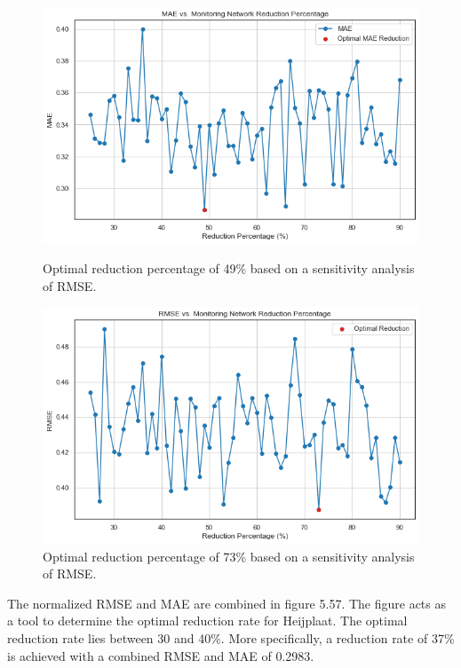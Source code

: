 \begin{figure}[h]
    \centering
    \begin{minipage}{0.45\linewidth}
        \includegraphics[width=\linewidth]{heij37rr.png}
        \caption{Optimal reduction percentage of 49\% based on a sensitivity analysis of RMSE.}
    \end{minipage}
    \hfill
    \begin{minipage}{0.45\linewidth}
        \includegraphics[width=\linewidth]{heij37rrrm.png}
        \caption{Optimal reduction percentage of 73\% based on a sensitivity analysis of RMSE.}
    \end{minipage}
\end{figure}

The normalized RMSE and MAE are combined in figure 5.57. The figure acts as a tool to determine the optimal reduction rate for Heijplaat. The optimal reduction rate lies between 30 and 40\%. More specifically, a reduction rate of 37\% is achieved with a combined RMSE and MAE of 0.2983.

